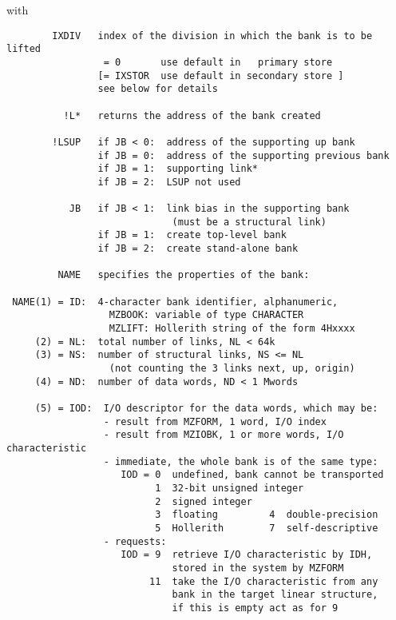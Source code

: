 with
\begin{verbatim}
        IXDIV   index of the division in which the bank is to be lifted
                 = 0       use default in   primary store
                [= IXSTOR  use default in secondary store ]
                see below for details

          !L*   returns the address of the bank created

        !LSUP   if JB < 0:  address of the supporting up bank
                if JB = 0:  address of the supporting previous bank
                if JB = 1:  supporting link*
                if JB = 2:  LSUP not used

           JB   if JB < 1:  link bias in the supporting bank
                             (must be a structural link)
                if JB = 1:  create top-level bank
                if JB = 2:  create stand-alone bank

         NAME   specifies the properties of the bank:

 NAME(1) = ID:  4-character bank identifier, alphanumeric,
                  MZBOOK: variable of type CHARACTER
                  MZLIFT: Hollerith string of the form 4Hxxxx
     (2) = NL:  total number of links, NL < 64k
     (3) = NS:  number of structural links, NS <= NL
                  (not counting the 3 links next, up, origin)
     (4) = ND:  number of data words, ND < 1 Mwords

     (5) = IOD:  I/O descriptor for the data words, which may be:
                 - result from MZFORM, 1 word, I/O index
                 - result from MZIOBK, 1 or more words, I/O characteristic
                 - immediate, the whole bank is of the same type:
                    IOD = 0  undefined, bank cannot be transported
                          1  32-bit unsigned integer
                          2  signed integer
                          3  floating         4  double-precision
                          5  Hollerith        7  self-descriptive
                 - requests:
                    IOD = 9  retrieve I/O characteristic by IDH,
                             stored in the system by MZFORM
                         11  take the I/O characteristic from any
                             bank in the target linear structure,
                             if this is empty act as for 9
\end{verbatim}


